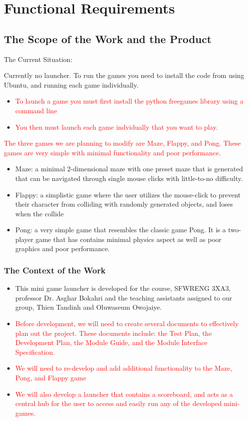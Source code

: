 \documentclass[12pt, titlepage]{article}
\begin{document}
\section{Functional Requirements}

\subsection{The Scope of the Work and the Product}

The Current Situation:

Currently no launcher. To run the games you need to install the code from using Ubuntu, and running each game individually.
\begin{itemize}
    \item \textcolor{red}{To launch a game you must first install the python freegames library using a command line}
    \item \textcolor{red}{You then must launch each game indvidually that you want to play.}
\end{itemize}

\textcolor{red}{The three games we are planning to modify are Maze, Flappy, and Pong. These games are very simple with minimal functionality and poor performance.}
\begin{itemize}
    \item Maze: a minimal 2-dimensional maze with one preset maze that is generated that can be navigated through single mouse clicks with little-to-no difficulty.
    \item Flappy: a simplistic game where the user utilizes the mouse-click to prevent their character from colliding with randomly generated objects, and loses when the collide
    \item Pong: a very simple game that resembles the classic game Pong. It is a two-player game that has contains minimal physics aspect as well as poor graphics and poor performance.
\end{itemize}

\subsubsection{The Context of the Work}
\begin{itemize}
    \item This mini game launcher is developed for the course, SFWRENG 3XA3, professor Dr. Asghar Bokahri and the teaching assistants assigned to our group, Thien Tandinh and Oluwaseum Owojaiye.
    \item \textcolor{red}{Before development, we will need to create several documents to effectively plan out the project. These documents include: the Test Plan, the Development Plan, the Module Guide, and the Module Interface Specification.}
    \item \textcolor{red}{We will need to re-develop and add additional functionality to the Maze, Pong, and Flappy game}
    \item \textcolor{red}{We will also develop a launcher that contains a scoreboard, and acts as a central hub for the user to access and easily run any of the developed mini-games.}
\end{itemize}
\end{document}
